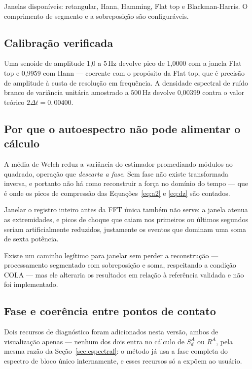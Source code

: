 \documentclass[11pt,a4paper]{article}
\newcommand{\unit}[2]{\ensuremath{#1\,\mathrm{#2}}}
\begin{document}
Janelas disponíveis: retangular, Hann, Hamming, Flat top e Blackman-Harris. O
comprimento de segmento e a sobreposição são configuráveis.

\subsection{Calibração verificada}

Uma senoide de amplitude 1,0 a \unit{5}{Hz} devolve pico de 1,0000 com a janela
Flat top e 0,9959 com Hann --- coerente com o propósito da Flat top, que é
precisão de amplitude à custa de resolução em frequência. A densidade espectral
de ruído branco de variância unitária amostrado a \unit{500}{Hz} devolve
0,00399 contra o valor teórico $2\Delta t = 0{,}00400$.

\subsection{Por que o autoespectro não pode alimentar o cálculo}

A média de Welch reduz a variância do estimador promediando módulos ao quadrado,
operação que \emph{descarta a fase}. Sem fase não existe transformada inversa, e
portanto não há como reconstruir a força no domínio do tempo --- que é onde os
picos de compressão das Equações~\eqref{eq:a2} e \eqref{eq:dz} são contados.

Janelar o registro inteiro antes da FFT única também não serve: a janela atenua
as extremidades, e picos de choque que caiam nos primeiros ou últimos segundos
seriam artificialmente reduzidos, justamente os eventos que dominam uma soma de
sexta potência.

Existe um caminho legítimo para janelar sem perder a reconstrução ---
processamento segmentado com sobreposição e soma, respeitando a condição COLA
--- mas ele alteraria os resultados em relação à referência validada e não foi
implementado.

\subsection{Fase e coerência entre pontos de contato}
\label{sec:fasecoerencia}

Dois recursos de diagnóstico foram adicionados nesta versão, ambos de
visualização apenas --- nenhum dos dois entra no cálculo de $S_d^A$ ou $R^A$,
pela mesma razão da Seção~\ref{sec:espectral}: o método já usa a fase completa
do espectro de bloco único internamente, e esses recursos só a expõem ao
usuário.
\end{document}
